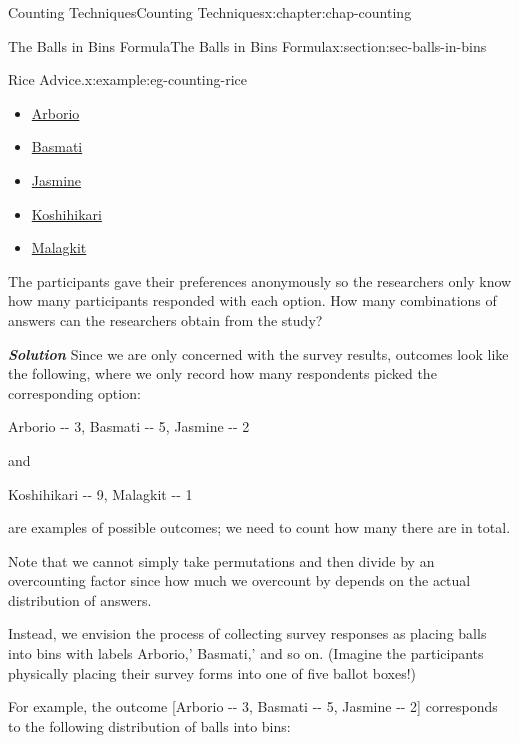 \documentclass[oneside,10pt,]{book}
\newcommand{\alert}[1]{\textbf{\textit{#1}}}
\numberwithin{equation}{section}
\begin{document}
\begin{chapterptx}{Counting Techniques}{}{Counting Techniques}{}{}{x:chapter:chap-counting}
\begin{sectionptx}{The Balls in Bins Formula}{}{The Balls in Bins Formula}{}{}{x:section:sec-balls-in-bins}
\begin{example}{Rice Advice.}{x:example:eg-counting-rice}
\begin{itemize}[label=\textbullet]
\item{}\href{https://en.wikipedia.org/wiki/Arborio_rice}{Arborio}%
\item{}\href{https://en.wikipedia.org/wiki/Basmati}{Basmati}%
\item{}\href{https://en.wikipedia.org/wiki/Jasmine_rice}{Jasmine}%
\item{}\href{https://en.wikipedia.org/wiki/Koshihikari}{Koshihikari}%
\item{}\href{https://en.wikipedia.org/wiki/Glutinous_rice}{Malagkit}%
\end{itemize}
The participants gave their preferences anonymously so the researchers only know how many participants responded with each option. How many combinations of answers can the researchers obtain from the study?%
\par
\alert{Solution} Since we are only concerned with the survey results, outcomes look like the following, where we only record how many respondents picked the corresponding option:%
\begin{sidebyside}{1}{0.125}{0.125}{0}%
\begin{sbspanel}{0.75}%
Arborio -{}-{} 3, Basmati -{}-{} 5, Jasmine -{}-{} 2%
\end{sbspanel}%
\end{sidebyside}%
\par
and%
\begin{sidebyside}{1}{0.125}{0.125}{0}%
\begin{sbspanel}{0.75}%
Koshihikari -{}-{} 9, Malagkit -{}-{} 1%
\end{sbspanel}%
\end{sidebyside}%
\par
are examples of possible outcomes; we need to count how many there are in total.%
\par
Note that we cannot simply take permutations and then divide by an overcounting factor since how much we overcount by depends on the actual distribution of answers.%
\par
Instead, we envision the process of collecting survey responses as placing balls into bins with labels \textasciigrave{}Arborio,' \textasciigrave{}Basmati,' and so on. (Imagine the participants physically placing their survey forms into one of five ballot boxes!)%
\par
For example, the outcome [Arborio -{}-{} 3, Basmati -{}-{} 5, Jasmine -{}-{} 2] corresponds to the following distribution of balls into bins:%
\begin{sidebyside}{1}{0.05}{0.05}{0}%

\end{sidebyside}
\end{example}
\end{sectionptx}
\end{chapterptx}
\end{document}
